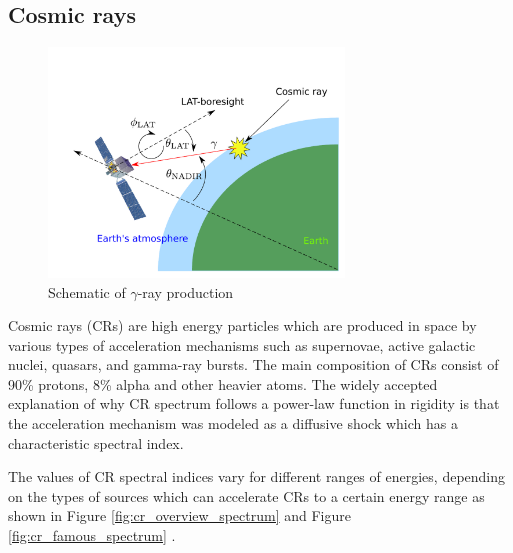 \subsection{Cosmic rays}
\begin{figure}[h!]
    \centering
    \includegraphics[width=0.7\textwidth]{img/gamma_production_schematic}
    \caption{Schematic of $\gamma$-ray production}
\end{figure}
Cosmic rays (CRs) are high energy particles which are produced in space by various types
of acceleration mechanisms such as supernovae, active galactic nuclei, quasars, and
gamma-ray bursts. The main composition of CRs consist of 90\% protons, 8\% alpha
and other heavier atoms.
The widely accepted explanation of why CR spectrum follows a power-law function in rigidity is that the acceleration mechanism was modeled as a diffusive shock which has a characteristic spectral index.

\par The values of CR spectral indices vary for different ranges of energies, depending on the types of sources which can accelerate CRs to a certain energy range as shown in Figure \ref{fig:cr_overview_spectrum} and Figure \ref{fig:cr_famous_spectrum} \cite{Swordy2001}.

